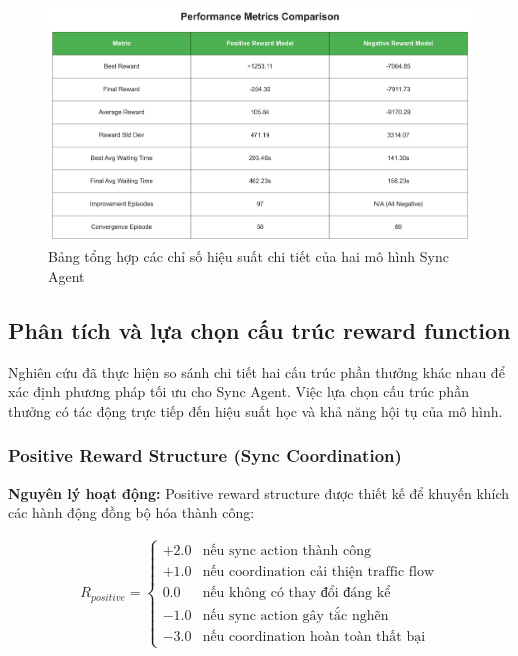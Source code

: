 \begin{figure}[!htp]
    \centering
    \includegraphics[width=\textwidth]{figures/sync_performance_metrics.png}
    \caption{Bảng tổng hợp các chỉ số hiệu suất chi tiết của hai mô hình Sync Agent}
    \label{fig:sync_performance_metrics}
\end{figure}


\subsection{Phân tích và lựa chọn cấu trúc reward function}

Nghiên cứu đã thực hiện so sánh chi tiết hai cấu trúc phần thưởng khác nhau để xác định phương pháp tối ưu cho Sync Agent. Việc lựa chọn cấu trúc phần thưởng có tác động trực tiếp đến hiệu suất học và khả năng hội tụ của mô hình.

\subsubsection{Positive Reward Structure (Sync Coordination)}

\textbf{Nguyên lý hoạt động:} Positive reward structure được thiết kế để khuyến khích
các hành động đồng bộ hóa thành công:

\begin{align}
    R_{positive}= \begin{cases}+2.0&\text{nếu sync action thành công}\\ +1.0&\text{nếu coordination cải thiện traffic flow}\\ 0.0&\text{nếu không có thay đổi đáng kể}\\ -1.0&\text{nếu sync action gây tắc nghẽn}\\ -3.0&\text{nếu coordination hoàn toàn thất bại}\end{cases}
\end{align}

